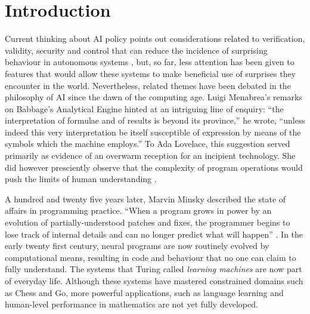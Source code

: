\ifdraft{\tableofcontents
\clearpage
}{}

\section{Introduction} \label{sec:why-this-matters}
Current thinking about AI policy points out considerations related to verification, validity, security and control that can reduce the incidence of surprising behaviour in autonomous systems \cite{research-priorities}, but, so far, less attention has been given to features that would allow these systems to make beneficial use of surprises they encounter in the world. 
%
Nevertheless, related themes have been debated in the philosophy of AI since the dawn of the computing age.  Luigi Menabrea's \cite[p.~689]{menabrea1842sketch} remarks on Babbage's Analytical Engine hinted at an intriguing line of enquiry: ``the interpretation of formulae and of results is beyond its province,'' he wrote, ``unless indeed this very interpretation be itself susceptible of expression by means of the symbols which the machine employs.''  To Ada Lovelace, this suggestion served primarily as evidence of an overwarm reception for an incipient technology.  She did however presciently observe that the complexity of program operations would push the limits of human understanding \cite[p.~710]{lovelace}.

A hundred and twenty five years later, Marvin Minsky described the state of affairs in programming practice.  ``When a program grows in power by an evolution of partially-understood patches and fixes, the programmer begins to lose track of internal details and can no longer predict what will happen'' \cite{minsky1967programming}.
In the early twenty first century, neural programs are now routinely evolved by computational means, resulting in code and behaviour that no one can claim to fully understand.  The systems that Turing called \emph{learning machines} \cite{turing1950mind} are now part of everyday life.  Although these systems have mastered constrained domains such as Chess and Go, more powerful applications, such as language learning and human-level performance in mathematics \cite{turing1948intelligentreport} are not yet fully developed.     

